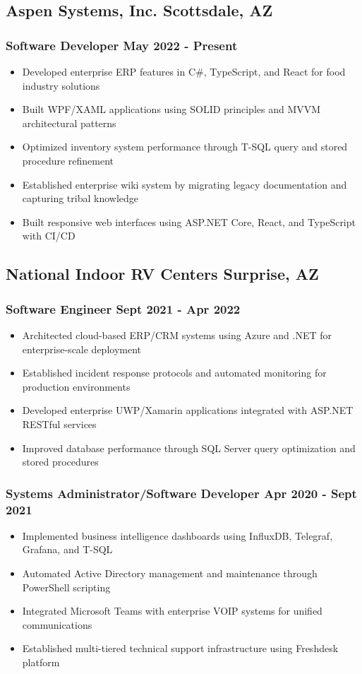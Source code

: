 \documentclass[11pt]{article} %
\begin{document}
\subsection*{Aspen Systems, Inc. \hfill Scottsdale, AZ}
\subsubsection{Software Developer \hfill May 2022 - Present}
\begin{itemize}
    \item Developed enterprise ERP features in C\#, TypeScript, and React for food industry solutions
    \item Built WPF/XAML applications using SOLID principles and MVVM architectural patterns
    \item Optimized inventory system performance through T-SQL query and stored procedure refinement
    \item Established enterprise wiki system by migrating legacy documentation and capturing tribal knowledge
    \item Built responsive web interfaces using ASP.NET Core, React, and TypeScript with CI/CD
\end{itemize}

\subsection{National Indoor RV Centers \hfill Surprise, AZ}
\subsubsection{Software Engineer \hfill Sept 2021 - Apr 2022}
\begin{itemize}
	\item Architected cloud-based ERP/CRM systems using Azure and .NET for enterprise-scale deployment
	\item Established incident response protocols and automated monitoring for production environments
	\item Developed enterprise UWP/Xamarin applications integrated with ASP.NET RESTful services
	\item Improved database performance through SQL Server query optimization and stored procedures
	\end{itemize}
	
	\subsubsection{Systems Administrator/Software Developer \hfill Apr 2020 - Sept 2021}
	\begin{itemize}
	\item Implemented business intelligence dashboards using InfluxDB, Telegraf, Grafana, and T-SQL
	\item Automated Active Directory management and maintenance through PowerShell scripting
	\item Integrated Microsoft Teams with enterprise VOIP systems for unified communications
	\item Established multi-tiered technical support infrastructure using Freshdesk platform
\end{itemize}
\end{document}
